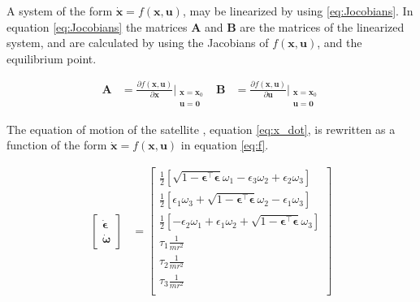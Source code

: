 A system of the form $\dot{\mathbf{x}} = f(\mathbf{x , u})$, may be linearized by using \eqref{eq:Jocobians}. In equation \eqref{eq:Jocobians} the matrices \textbf{A} and \textbf{B} are the matrices of the linearized system, and are calculated by using the Jacobians of $f(\mathbf{x},\mathbf{u}) $, and the equilibrium point.  

\begin{equation}
    \begin{aligned}
        \mathbf{A}&= \frac{\partial f(\mathbf{x,\boldsymbol{u}})}{\partial \mathbf{x}}\Bigr|_{\substack{\mathbf{x}= \mathbf{x}_0 \\ \boldsymbol{u} =\mathbf{0}}} &
        \mathbf{B}&= \frac{\partial f(\mathbf{x,\boldsymbol{u}})}{\partial \mathbf{u}}\Bigr|_{\substack{\mathbf{x}= \mathbf{x}_0 \\ \boldsymbol{u} =\mathbf{0}}} 
    \end{aligned}
    \label{eq:Jocobians}
\end{equation}

The equation of motion of the satellite , equation \eqref{eq:x_dot}, is rewritten as a function of the form $\dot{\mathbf{x}} = f(\mathbf{x , u})$ in equation \eqref{eq:f}.

\begin{equation}
    \begin{aligned}
    \begin{bmatrix}
		\dot{\boldsymbol{\epsilon}} \\
		\dot{\boldsymbol{\omega}}
    \end{bmatrix}
	&= 
	\begin{bmatrix}
		\frac{1}{2}[ \sqrt{1-\boldsymbol{\epsilon}^\top \boldsymbol{\epsilon}} \omega_1  - \epsilon_3 \omega_2 + \epsilon_2 \omega_3  ] \\
		\frac{1}{2}[ \epsilon_1 \omega_3 +  \sqrt{1-\boldsymbol{\epsilon}^\top \boldsymbol{\epsilon}} \omega_2  - \epsilon_1 \omega_3 ] \\
		\frac{1}{2}[  - \epsilon_2 \omega_1  + \epsilon_1 \omega_2 + \sqrt{1-\boldsymbol{\epsilon}^\top \boldsymbol{\epsilon}} \omega_3  ] \\
		\tau_1 \frac{1}{mr^2}\\
		\tau_2 \frac{1}{mr^2}\\
		\tau_3 \frac{1}{mr^2}\\
	\end{bmatrix}
	\label{eq:f}
	\end{aligned}
\end{equation}



